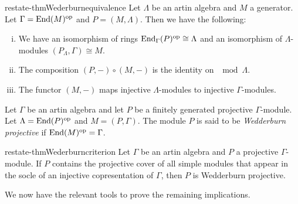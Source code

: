 \begin{restatable}{restate-thm}{Wederburnequivalence} \label{thm:hom_generator_equivalence}
	Let $\Lambda$ be an artin algebra and $M$ a generator. Let $\Gamma = \operatorname{End}(M)^{\operatorname{op}}$ and $P=(M, \Lambda)$. Then we have the following:
	\begin{enumerate}[i)]
		\item We have an isomorphism of rings $\operatorname{End}_\Gamma(P)^{\operatorname{op}} \cong \Lambda$ and an isomorphism of $\Lambda$-modules $(P_\Lambda, \Gamma) \cong M$.
		\item The composition $(P,-)\circ (M,-)$ is the identity on $\mod\Lambda$.
		\item The functor $(M,-)$ maps injective $\Lambda$-modules to injective $\Gamma$-modules. 
	\end{enumerate}
\end{restatable}

\begin{defn}
	Let $\Gamma$ be an artin algebra and let $P$ be a finitely generated projective $\Gamma$-module. Let $\Lambda = \operatorname{End}(P)^{\operatorname{op}}$ and $M=(P, \Gamma)$. The module $P$ is said to be \emph{Wedderburn projective} if $\operatorname{End}(M)^{\operatorname{op}}=\Gamma$.
\end{defn}

\begin{restatable}{restate-thm}{Wederburncriterion}\label{thm:wedderburn_criterion}
	Let $\Gamma$ be an artin algebra and $P$ a projective $\Gamma$-module. If $P$ contains the projective cover of all simple modules that appear in the socle of an injective copresentation of $\Gamma$, then $P$ is Wedderburn projective.
\end{restatable}

We now have the relevant tools to prove the remaining implications.


